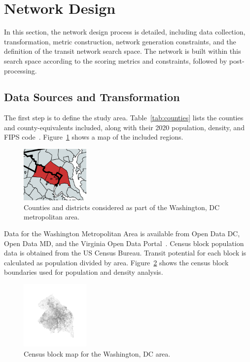 \documentclass[sigconf,nonacm]{acmart}
\begin{document}
\section{Network Design}

In this section, the network design process is detailed, including data collection, transformation, metric construction, network generation constraints, and the definition of the transit network search space. The network is built within this search space according to the scoring metrics and constraints, followed by post-processing.

\subsection{Data Sources and Transformation}
The first step is to define the study area. Table~\ref{tab:counties} lists the counties and county-equivalents included, along with their 2020 population, density, and FIPS code~\cite{lit:census}. Figure~\ref{fig:area_considered} shows a map of the included regions.
\begin{figure}[ht]
    \centering
    \includegraphics[width=0.3\textwidth]{./img/area_considered.png}
    \caption{Counties and districts considered as part of the Washington, DC metropolitan area.}
    \label{fig:area_considered}
\end{figure}

Data for the Washington Metropolitan Area is available from Open Data DC, Open Data MD, and the Virginia Open Data Portal~\cite{lit:opendata}. Census block population data is obtained from the US Census Bureau. Transit potential for each block is calculated as population divided by area. Figure~\ref{fig:city_map} shows the census block boundaries used for population and density analysis.

\begin{figure}[ht]
    \centering
    \includegraphics[width=0.3\textwidth]{./img/city_map.png}
    \caption{Census block map for the Washington, DC area.}
    \label{fig:city_map}
\end{figure}
\end{document}
